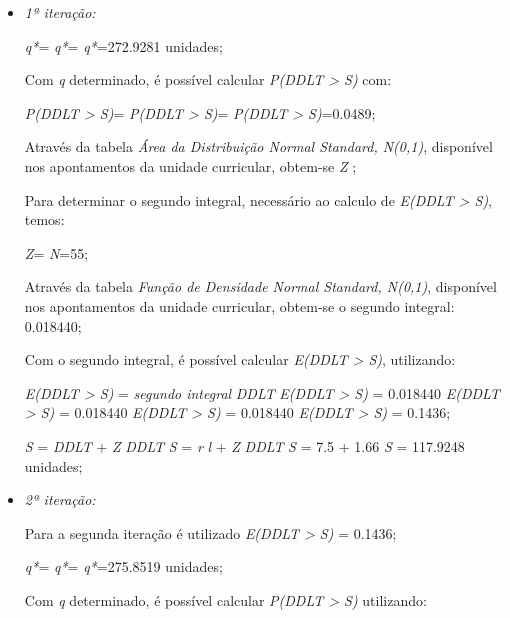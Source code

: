 \begin{itemize}
\item \emph{1ª iteração:}
 
	\emph{q*}=
	\emph{q*}=
	\emph{q*}=272.9281  unidades;

	Com \emph{q} determinado, é possível calcular \emph{P(DDLT > S)} com:

	\emph{P(DDLT > S)}=
	\emph{P(DDLT > S)}=
	\emph{P(DDLT > S)}=0.0489;

	Através da tabela \emph{Área da Distribuição Normal Standard, N(0,1)}, disponível nos apontamentos da unidade curricular, obtem-se \emph{Z} ;
	
	Para determinar o segundo integral, necessário ao calculo de \emph{E(DDLT > S)}, temos:
	
	\emph{Z}=
	\emph{N}=55;

	Através da tabela \emph{Função de Densidade Normal Standard, N(0,1)}, disponível nos apontamentos da unidade curricular, obtem-se o segundo integral: 0.018440;

	Com o segundo integral, é possível calcular \emph{E(DDLT > S)}, utilizando:

	\emph{E(DDLT > S)} = \emph{segundo integral} \times \emph{\sigma}\emph{DDLT}
	\emph{E(DDLT > S)} = 0.018440 \times {}
	\emph{E(DDLT > S)} = 0.018440 \times {}
	\emph{E(DDLT > S)} = 0.018440 
	\emph{E(DDLT > S)} = 0.1436;

	\emph{S} = \emph{\mu}\emph{DDLT} + \emph{Z} \times \emph{\sigma}\emph{DDLT}
	\emph{S} = \emph{r} \times \emph{l} + \emph{Z} \times \emph{\sigma}\emph{DDLT}
	\emph{S} = 7.5  + 1.66 
	\emph{S} = 117.9248  unidades;

	
\item \emph{2ª iteração:}
	
	Para a segunda iteração é utilizado \emph{E(DDLT > S)} = 0.1436;
	
	\emph{q*}=
	\emph{q*}=
	\emph{q*}=275.8519  unidades;

	Com \emph{q} determinado, é possível calcular \emph{P(DDLT > S)} utilizando:


\end{itemize}
